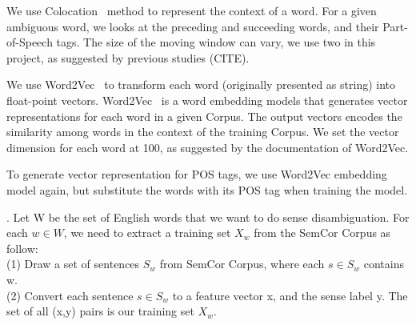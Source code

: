 We use Colocation~\cite{colocation} method to represent the context of a word.
For a given ambiguous word, we looks at the preceding and succeeding words,
and their Part-of-Speech tags.
The size of the moving window can vary, we use two in this project, as suggested
by previous studies (CITE).
\begin{equation}
  [w_{i-2},POS_{i-2},w_{i-1},POS_{i-1},w_{i+1},POS_{i+1},w_{i+1},POS_{i+1}]
\end{equation}

We use Word2Vec~\cite{mikolov2013distributed} to transform each word (originally
presented as string) into float-point vectors.
Word2Vec~\cite{mikolov2013distributed} is a word embedding models that generates
vector representations for each word in a given Corpus.
The output vectors encodes the similarity among words in the context of the
training Corpus.
We set the vector dimension for each word at 100, as suggested by the documentation of
Word2Vec.

To generate vector representation for POS tags, we use Word2Vec embedding model
again, but substitute the words with its POS tag when training the model.

.
Let W be the set of English words that we want to do sense disambiguation. For
each $w \in W$, we need to extract a training set $X_w$ from the SemCor Corpus
as follow: \\
  (1) Draw a set of sentences $S_w$ from SemCor Corpus, where each 
$s \in S_w$ contains w. \\
  (2) Convert each sentence $s \in S_w$ to a feature vector x, and the sense
    label y. The set of all (x,y) pairs is our training set $X_w$.

